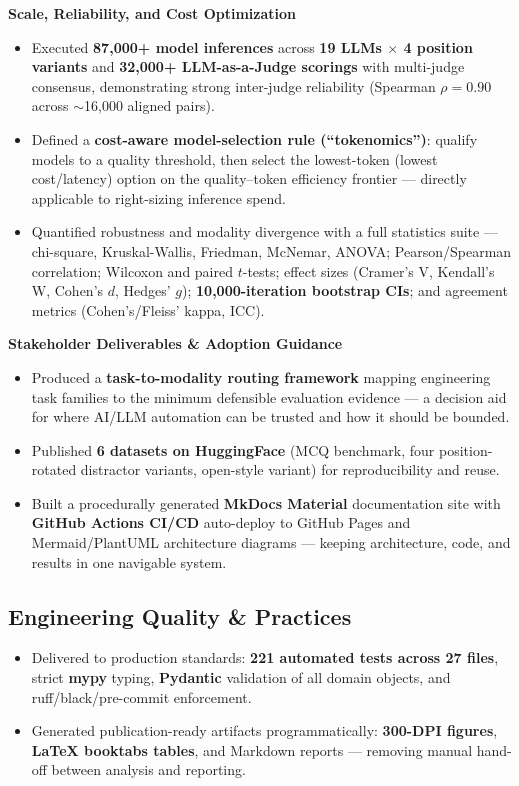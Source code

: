 \documentclass[10pt,letterpaper]{article}
\begin{document}
\textbf{Scale, Reliability, and Cost Optimization}
\begin{itemize}
  \item Executed \textbf{87{,}000+ model inferences} across \textbf{19 LLMs $\times$ 4 position
        variants} and \textbf{32{,}000+ LLM-as-a-Judge scorings} with multi-judge consensus,
        demonstrating strong inter-judge reliability (Spearman $\rho = 0.90$ across
        $\sim$16{,}000 aligned pairs).
  \item Defined a \textbf{cost-aware model-selection rule (``tokenomics'')}: qualify models to a
        quality threshold, then select the lowest-token (lowest cost/latency) option on the
        quality--token efficiency frontier --- directly applicable to right-sizing inference spend.
  \item Quantified robustness and modality divergence with a full statistics suite --- chi-square,
        Kruskal-Wallis, Friedman, McNemar, ANOVA; Pearson/Spearman correlation; Wilcoxon and
        paired $t$-tests; effect sizes (Cramer's V, Kendall's W, Cohen's $d$, Hedges' $g$);
        \textbf{10{,}000-iteration bootstrap CIs}; and agreement metrics (Cohen's/Fleiss' kappa, ICC).
\end{itemize}

\textbf{Stakeholder Deliverables \& Adoption Guidance}
\begin{itemize}
  \item Produced a \textbf{task-to-modality routing framework} mapping engineering task families
        to the minimum defensible evaluation evidence --- a decision aid for where AI/LLM
        automation can be trusted and how it should be bounded.
  \item Published \textbf{6 datasets on HuggingFace} (MCQ benchmark, four position-rotated
        distractor variants, open-style variant) for reproducibility and reuse.
  \item Built a procedurally generated \textbf{MkDocs Material} documentation site with
        \textbf{GitHub Actions CI/CD} auto-deploy to GitHub Pages and Mermaid/PlantUML
        architecture diagrams --- keeping architecture, code, and results in one navigable system.
\end{itemize}

\subsection{Engineering Quality \& Practices}
\begin{itemize}
  \item Delivered to production standards: \textbf{221 automated tests across 27 files}, strict
        \textbf{mypy} typing, \textbf{Pydantic} validation of all domain objects, and
        ruff/black/pre-commit enforcement.
  \item Generated publication-ready artifacts programmatically: \textbf{300-DPI figures},
        \textbf{LaTeX booktabs tables}, and Markdown reports --- removing manual hand-off between
        analysis and reporting.
\end{itemize}
\end{document}
